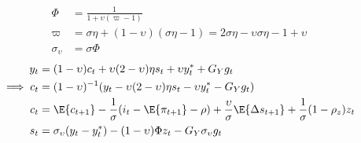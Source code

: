 \begin{align}
    \Phi &= \frac{1}{1 + \upsilon (\varpi - 1)}\\
    \varpi &=  \sigma \eta + (1-\upsilon)(\sigma \eta - 1) = 2\sigma \eta-\upsilon\sigma \eta -1 + \upsilon\\
    \sigma_\upsilon &= \sigma \Phi
\end{align}
\pagebreak
\begin{align}
    y_t &= (1-\upsilon)c_t + \upsilon(2-\upsilon)\eta s_t + \upsilon y_t^* + G_Y g_t\\
    \implies c_t &= (1-\upsilon)^{-1}(y_t - \upsilon(2-\upsilon)\eta s_t - \upsilon y_t^* - G_Y g_t)\\
    c_t &= \E \{ c_{t+1}\} - \frac{1}{\sigma}(i_t - \E \{ \pi_{t+1}\} - \rho) + \frac{\upsilon}{\sigma}\E \{ \Delta s_{t+1} \} + \frac{1}{\sigma}(1-\rho_z)z_t \\
    s_t &= \sigma_\upsilon(y_t - y^*_t) - (1-\upsilon)\Phi z_t - G_Y \sigma_\upsilon g_t\\
\end{align}
